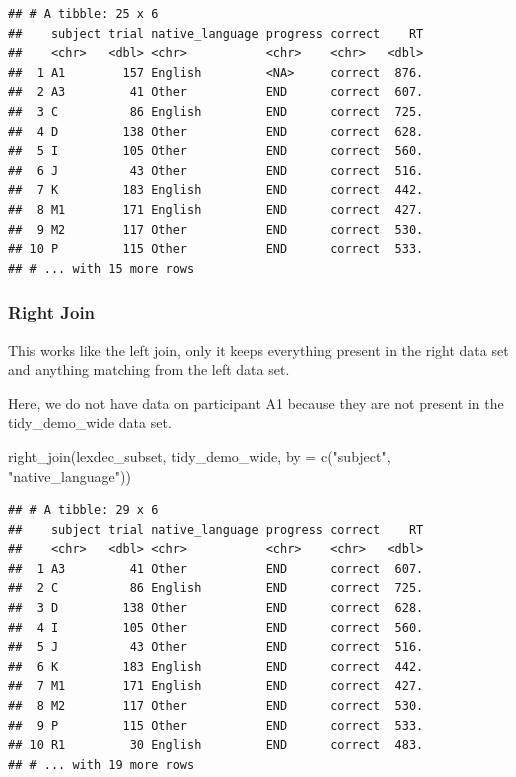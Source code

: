 \documentclass[
]{book}
\newenvironment{Shaded}{\begin{snugshade}}{\end{snugshade}}
\newcommand{\AttributeTok}[1]{\textcolor[rgb]{0.77,0.63,0.00}{#1}}
\newcommand{\FunctionTok}[1]{\textcolor[rgb]{0.00,0.00,0.00}{#1}}
\newcommand{\NormalTok}[1]{#1}
\newcommand{\StringTok}[1]{\textcolor[rgb]{0.31,0.60,0.02}{#1}}
\begin{document}
\begin{verbatim}
## # A tibble: 25 x 6
##    subject trial native_language progress correct    RT
##    <chr>   <dbl> <chr>           <chr>    <chr>   <dbl>
##  1 A1        157 English         <NA>     correct  876.
##  2 A3         41 Other           END      correct  607.
##  3 C          86 English         END      correct  725.
##  4 D         138 Other           END      correct  628.
##  5 I         105 Other           END      correct  560.
##  6 J          43 Other           END      correct  516.
##  7 K         183 English         END      correct  442.
##  8 M1        171 English         END      correct  427.
##  9 M2        117 Other           END      correct  530.
## 10 P         115 Other           END      correct  533.
## # ... with 15 more rows
\end{verbatim}

\hypertarget{right-join}{%
\subsubsection{Right Join}\label{right-join}}

This works like the left join, only it keeps everything present in the right data set and anything matching from the left data set.

Here, we do not have data on participant A1 because they are not present in the tidy\_demo\_wide data set.

\begin{Shaded}
\begin{Highlighting}[]
\FunctionTok{right\_join}\NormalTok{(lexdec\_subset, tidy\_demo\_wide, }\AttributeTok{by =} \FunctionTok{c}\NormalTok{(}\StringTok{"subject"}\NormalTok{, }\StringTok{"native\_language"}\NormalTok{))}
\end{Highlighting}
\end{Shaded}

\begin{verbatim}
## # A tibble: 29 x 6
##    subject trial native_language progress correct    RT
##    <chr>   <dbl> <chr>           <chr>    <chr>   <dbl>
##  1 A3         41 Other           END      correct  607.
##  2 C          86 English         END      correct  725.
##  3 D         138 Other           END      correct  628.
##  4 I         105 Other           END      correct  560.
##  5 J          43 Other           END      correct  516.
##  6 K         183 English         END      correct  442.
##  7 M1        171 English         END      correct  427.
##  8 M2        117 Other           END      correct  530.
##  9 P         115 Other           END      correct  533.
## 10 R1         30 English         END      correct  483.
## # ... with 19 more rows
\end{verbatim}
\end{document}
